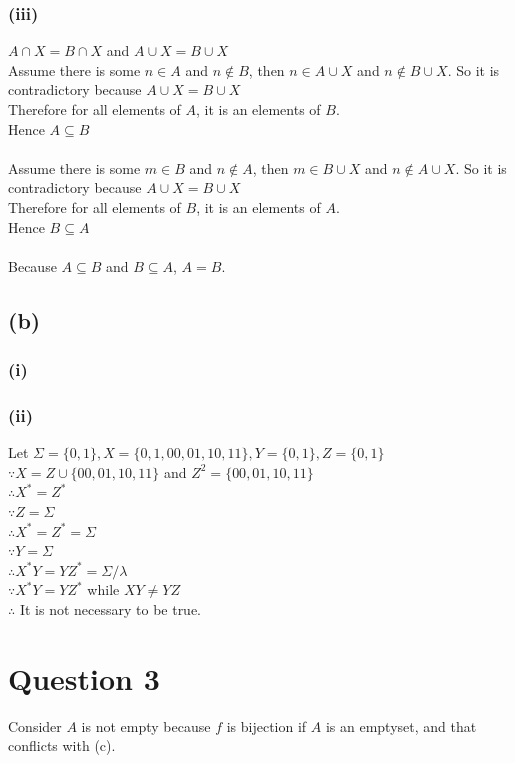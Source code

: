 \documentclass{article} %
\begin{document}
\subsubsection*{(iii)}
$A \cap X = B \cap X$ and $A \cup X = B \cup X$\\
Assume there is some $n \in A$ and $n \notin B$, then $n \in A \cup X$ and $n \notin B \cup X$. So it is contradictory because $A \cup X = B \cup X$\\
Therefore for all elements of $A$, it is an elements of $B$.\\
Hence $A \subseteq B$\\
\\
Assume there is some $m \in B$ and $n \notin A$, then $m \in B \cup X$ and $n \notin A \cup X$. So it is contradictory because $A \cup X = B \cup X$\\
Therefore for all elements of $B$, it is an elements of $A$.\\
Hence $B \subseteq A$\\
\\
Because $A \subseteq B$ and $B \subseteq A$, $A = B$.
\subsection*{(b)}
\subsubsection*{(i)}

\subsubsection*{(ii)}
Let $\Sigma = \{0, 1\}, X = \{0, 1, 00, 01, 10, 11\}, Y =\{0, 1\}, Z=\{0, 1\}$\\
$\because X = Z \cup \{00,01,10,11\}$ and $Z^2 = \{00,01,10,11\}$\\
$\therefore X^*=Z^*$\\
$\because Z= \Sigma$\\
$\therefore X^*=Z^*=\Sigma $\\
$\because Y = \Sigma $\\
$\therefore X^*Y = YZ^* = \Sigma/\lambda$\\
$\because X^*Y = YZ^*$ while $XY \neq YZ$\\
$\therefore$ It is not necessary to be true.

\section*{Question 3}
Consider $A$ is not empty because $f$ is bijection if $A$ is an emptyset, and that conflicts with (c).
\end{document}
